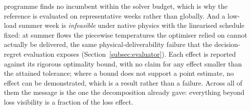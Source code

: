 \documentclass[a4paper,fleqn]{cas-sc}
\begin{document}
programme finds no incumbent within the solver budget, which is why the reference is evaluated on
representative weeks rather than globally. And a low-load summer week is \emph{infeasible} under
native physics with the linearised schedule fixed: at summer flows the piecewise temperatures the
optimiser relied on cannot actually be delivered, the same physical-deliverability failure that the
decision-regret evaluation exposes (Section~\ref{subsec:evaluator}). Each effect is reported against
its rigorous optimality bound, with no claim for any effect smaller than the attained tolerance;
where a bound does not support a point estimate, no effect can be demonstrated, which is a
result rather than a failure. Across all of them the message is the one the decomposition
already gave: everything beyond loss visibility is a fraction of the loss effect.

\end{document}
